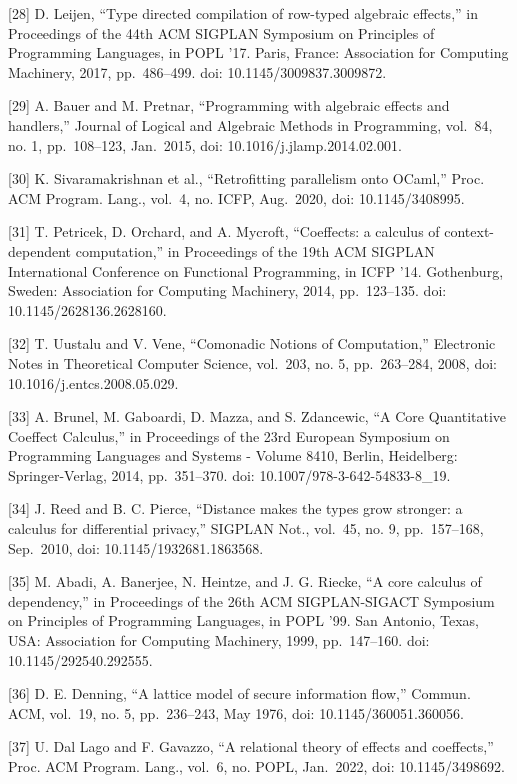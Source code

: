 \documentclass[
  10
]{article}
\begin{document}
{[}28{]} D. Leijen, ``Type directed compilation of row-typed algebraic effects,'' in
Proceedings of the 44th ACM SIGPLAN Symposium on Principles of Programming
Languages, in POPL '17. Paris, France: Association for Computing Machinery, 2017,
pp.~486--499. doi: 10.1145/3009837.3009872.

{[}29{]} A. Bauer and M. Pretnar, ``Programming with algebraic effects and handlers,''
Journal of Logical and Algebraic Methods in Programming, vol.~84, no. 1,
pp.~108--123, Jan.~2015, doi: 10.1016/j.jlamp.2014.02.001.

{[}30{]} K. Sivaramakrishnan et al., ``Retrofitting parallelism onto OCaml,'' Proc.
ACM Program. Lang., vol.~4, no. ICFP, Aug.~2020, doi: 10.1145/3408995.

{[}31{]} T. Petricek, D. Orchard, and A. Mycroft, ``Coeffects: a calculus of
context-dependent computation,'' in Proceedings of the 19th ACM SIGPLAN
International Conference on Functional Programming, in ICFP '14. Gothenburg,
Sweden: Association for Computing Machinery, 2014, pp.~123--135. doi:
10.1145/2628136.2628160.

{[}32{]} T. Uustalu and V. Vene, ``Comonadic Notions of Computation,'' Electronic
Notes in Theoretical Computer Science, vol.~203, no. 5, pp.~263--284, 2008, doi:
10.1016/j.entcs.2008.05.029.

{[}33{]} A. Brunel, M. Gaboardi, D. Mazza, and S. Zdancewic, ``A Core Quantitative
Coeffect Calculus,'' in Proceedings of the 23rd European Symposium on Programming
Languages and Systems - Volume 8410, Berlin, Heidelberg: Springer-Verlag, 2014,
pp.~351--370. doi: 10.1007/978-3-642-54833-8\_19.

{[}34{]} J. Reed and B. C. Pierce, ``Distance makes the types grow stronger: a
calculus for differential privacy,'' SIGPLAN Not., vol.~45, no. 9, pp.~157--168,
Sep.~2010, doi: 10.1145/1932681.1863568.

{[}35{]} M. Abadi, A. Banerjee, N. Heintze, and J. G. Riecke, ``A core calculus of
dependency,'' in Proceedings of the 26th ACM SIGPLAN-SIGACT Symposium on
Principles of Programming Languages, in POPL '99. San Antonio, Texas, USA:
Association for Computing Machinery, 1999, pp.~147--160. doi: 10.1145/292540.292555.

{[}36{]} D. E. Denning, ``A lattice model of secure information flow,'' Commun. ACM,
vol.~19, no. 5, pp.~236--243, May 1976, doi: 10.1145/360051.360056.

{[}37{]} U. Dal Lago and F. Gavazzo, ``A relational theory of effects and coeffects,''
Proc. ACM Program. Lang., vol.~6, no. POPL, Jan.~2022, doi: 10.1145/3498692.
\end{document}
